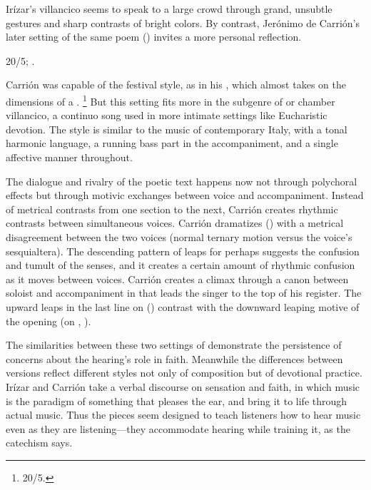 Irízar's villancico seems to speak to a large crowd through grand, unsubtle 
gestures and sharp contrasts of bright colors.
By contrast, Jerónimo de Carrión's later setting of the same poem 
() invites a more personal 
reflection.%
    \begin{Footnote}
        \signature{E-SE}{20/5}; \autocite{Cashner:SingingAboutSingingI}.
    \end{Footnote}
Carrión was capable of the festival style, as in his , which almost takes on the dimensions of a .%
    \footnote{\signature{E-SE}{20/5}.}
But this setting fits more in the subgenre of  or chamber 
villancico, a continuo song used in more intimate settings like Eucharistic 
devotion.%
    \Autocite[See, for example,][]{Robledo:MadridTonos}
The style is similar to the  music of contemporary Italy, 
with a tonal harmonic language, a running bass part in the accompaniment, and a 
single affective manner throughout.



The dialogue and rivalry of the poetic text happens now not through polychoral 
effects but through motivic exchanges between voice and accompaniment.
Instead of metrical contrasts from one section to the next, Carrión creates 
rhythmic contrasts between simultaneous voices.
Carrión dramatizes  () with a metrical 
disagreement between the two voices (normal ternary motion versus the voice's 
sesquialtera).
The descending pattern of leaps for  
perhaps suggests the confusion and tumult of the senses, and it creates a 
certain amount of rhythmic confusion as it moves between voices.
Carrión creates a climax through a canon between soloist and accompaniment in 
 that leads the singer to the top of his register.
The upward leaps in the last line on  () 
contrast with the downward leaping motive of the opening (on 
, ).

The similarities between these two settings of  
demonstrate the persistence of concerns about the hearing's role in faith.
Meanwhile the differences between versions reflect different styles not only of 
composition but of devotional practice.
Irízar and Carrión take a verbal discourse on sensation and faith, in which 
music is the paradigm of something that pleases the ear, and bring it to life 
through actual music.
Thus the pieces seem designed to teach listeners how to hear music even as they 
are listening---they accommodate hearing while training it, as the catechism 
says.


